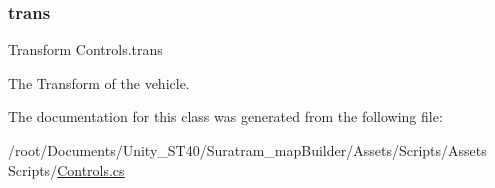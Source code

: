 \subsubsection{\texorpdfstring{trans}{trans}}
{\footnotesize\ttfamily Transform Controls.\+trans\hspace{0.3cm}{\ttfamily [private]}}



The Transform of the vehicle.



The documentation for this class was generated from the following file\+:\begin{DoxyCompactItemize}
\item 
/root/\+Documents/\+Unity\+\_\+\+S\+T40/\+Suratram\+\_\+map\+Builder/\+Assets/\+Scripts/\+Assets Scripts/\hyperlink{Controls_8cs}{Controls.\+cs}\end{DoxyCompactItemize}
